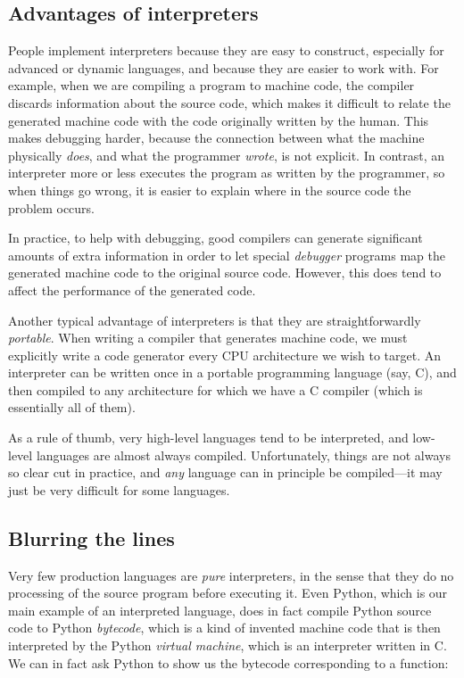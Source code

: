 \subsection{Advantages of interpreters}

People implement interpreters because they are easy to construct,
especially for advanced or dynamic languages, and because they are
easier to work with.  For example, when we are compiling a program to
machine code, the compiler discards information about the source code,
which makes it difficult to relate the generated machine code with the
code originally written by the human.  This makes debugging harder,
because the connection between what the machine physically
\textit{does}, and what the programmer \textit{wrote}, is not
explicit.  In contrast, an interpreter more or less executes the
program as written by the programmer, so when things go wrong, it is
easier to explain where in the source code the problem occurs.

In practice, to help with debugging, good compilers can generate
significant amounts of extra information in order to let special
\textit{debugger} programs map the generated machine code to the
original source code.  However, this does tend to affect the
performance of the generated code.

Another typical advantage of interpreters is that they are
straightforwardly \textit{portable}.  When writing a compiler that
generates machine code, we must explicitly write a code generator
every CPU architecture we wish to target.  An interpreter can be
written once in a portable programming language (say, C), and then
compiled to any architecture for which we have a C compiler (which is
essentially all of them).

As a rule of thumb, very high-level languages tend to be interpreted,
and low-level languages are almost always compiled.  Unfortunately,
things are not always so clear cut in practice, and \textit{any}
language can in principle be compiled---it may just be very difficult
for some languages.

\subsection{Blurring the lines}

Very few production languages are \textit{pure} interpreters, in the
sense that they do no processing of the source program before
executing it.  Even Python, which is our main example of an
interpreted language, does in fact compile Python source code to
Python \textit{bytecode}, which is a kind of invented machine code
that is then interpreted by the Python \textit{virtual machine}, which
is an interpreter written in C.  We can in fact ask Python to show us
the bytecode corresponding to a function:

